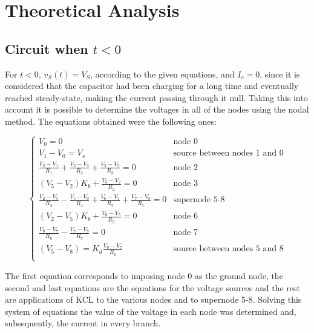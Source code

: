 \section{Theoretical Analysis}
\label{sec:analysis}



\subsection{Circuit when $t<0$} %
For $t<0$, $v_S(t) = V_S$, according to the given equations, and $I_c=0$, since it is considered that the capacitor had been charging for a long time and eventually reached steady-state, making the current passing through it null. Taking this into account it is possible to determine the voltages in all of the nodes using the nodal method. The equations obtained were the following ones:


\begin{equation}
  \begin{cases}
  V_0 = 0 & \mbox{node 0}\\
  V_1-V_0 = V_s & \mbox{source between nodes 1 and 0} \\
  \frac{V_2-V_1}{R_1}+\frac{V_2-V_3}{R_2}+\frac{V_2-V_5}{R_3} = 0 & \mbox{node 2} \\
  (V_5-V_2)K_b + \frac{V_3-V_2}{R_2} = 0 & \mbox{node 3} \\
  \frac{V_2-V_5}{R_3} - \frac{V_5-V_0}{R_4} + \frac{V_6-V_5}{R_5} + \frac{V_7-V_8}{R_7}  = 0 & \mbox{supernode 5-8} \\ 
  (V_2-V_5)K_b + \frac{V_6-V_5}{R_5} = 0 & \mbox{node 6} \\
  \frac{V_0-V_7}{R_6} - \frac{V_7-V_8}{R_7} = 0 & \mbox{node 7} \\
  (V_5-V_8) = K_d \frac{V_0-V_7}{R_6} & \mbox{source between nodes 5 and 8} \\
  \end{cases}
\end{equation}

The first equation corresponds to imposing node 0 as the ground node, the second and last equations are the equations for the voltage sources and the rest are applications of KCL to the various nodes and to supernode 5-8. %
Solving this system of equations the value of the voltage in each node was determined and, subsequently, the current in every branch.

